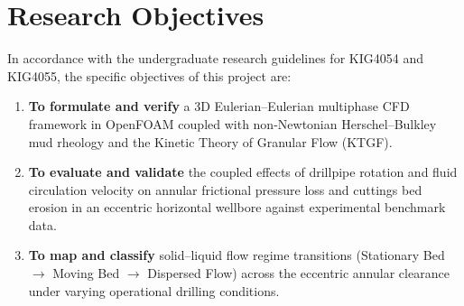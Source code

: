 \section{Research Objectives}
In accordance with the undergraduate research guidelines for KIG4054 and KIG4055, the specific objectives of this project are:
\begin{enumerate}
    \item \textbf{To formulate and verify} a 3D Eulerian--Eulerian multiphase CFD framework in OpenFOAM coupled with non-Newtonian Herschel--Bulkley mud rheology and the Kinetic Theory of Granular Flow (KTGF).
    
    \item \textbf{To evaluate and validate} the coupled effects of drillpipe rotation and fluid circulation velocity on annular frictional pressure loss and cuttings bed erosion in an eccentric horizontal wellbore against experimental benchmark data.
    
    \item \textbf{To map and classify} solid--liquid flow regime transitions (Stationary Bed $\rightarrow$ Moving Bed $\rightarrow$ Dispersed Flow) across the eccentric annular clearance under varying operational drilling conditions.
\end{enumerate}

